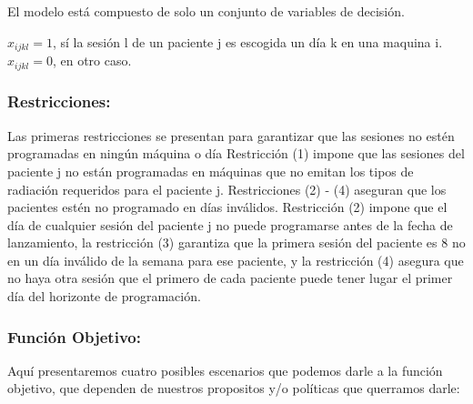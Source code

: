\documentclass[letter, 10pt]{article}
\begin{document}
El modelo está compuesto de solo un conjunto de variables de decisión.

$x_{ijkl} = 1$, sí la sesión l de un paciente j es escogida un día k en una maquina i.
$x_{ijkl} = 0$, en otro caso.




\subsubsection{Restricciones:}

Las primeras restricciones se presentan para garantizar que las sesiones no estén programadas en ningún
máquina o día Restricción (1) impone que las sesiones del paciente j no están programadas en máquinas que
no emitan los tipos de radiación requeridos para el paciente j. Restricciones (2) - (4) aseguran que los pacientes estén
no programado en días inválidos. Restricción (2) impone que el día de cualquier sesión del paciente j no puede
programarse antes de la fecha de lanzamiento, la restricción (3) garantiza que la primera sesión del paciente es
8
no en un día inválido de la semana para ese paciente, y la restricción (4) asegura que no haya otra sesión
que el primero de cada paciente puede tener lugar el primer día del horizonte de programación.

\subsubsection{Función Objetivo:}

Aquí presentaremos cuatro posibles escenarios que podemos darle a la función objetivo, que dependen de nuestros propositos y/o políticas que querramos darle:
\end{document}
